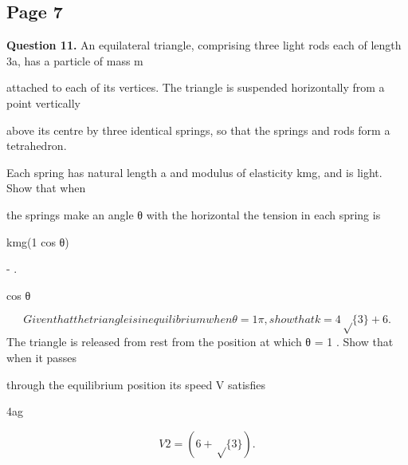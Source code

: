 \documentclass[12pt]{article}
\begin{document}
\subsection*{Page 7}
\begin{flushleft}
\bigskip\textbf{Question 11.} An equilateral triangle, comprising three light rods each of length \sqrt3a, has a particle of mass m\par
attached to each of its vertices. The triangle is suspended horizontally from a point vertically\par
above its centre by three identical springs, so that the springs and rods form a tetrahedron.\par
Each spring has natural length a and modulus of elasticity kmg, and is light. Show that when\par
the springs make an angle θ with the horizontal the tension in each spring is\par
kmg(1 cos θ)\par
- .\par
cos θ\par
\[Given that the triangle is in equilibrium when θ = 1 \pi, show that k = 4\sqrt\{3\} + 6.\]
The triangle is released from rest from the position at which θ = 1 \pi. Show that when it passes\par
through the equilibrium position its speed V satisfies\par
4ag\par
\[V 2 = (6 + \sqrt\{3\}) .\]
\end{flushleft}
\end{document}
